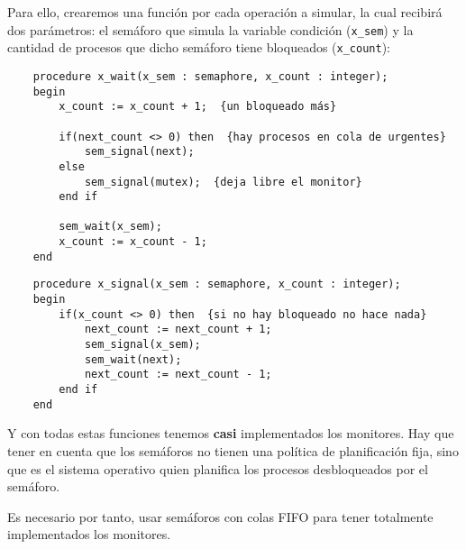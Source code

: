 Para ello, crearemos una función por cada operación a simular, la cual recibirá dos parámetros: el semáforo que simula la variable condición (\verb|x_sem|) y la cantidad de procesos que dicho semáforo tiene bloqueados (\verb|x_count|):
\begin{verbatim}
    procedure x_wait(x_sem : semaphore, x_count : integer);
    begin
        x_count := x_count + 1;  {un bloqueado más}

        if(next_count <> 0) then  {hay procesos en cola de urgentes}
            sem_signal(next);
        else
            sem_signal(mutex);  {deja libre el monitor}
        end if

        sem_wait(x_sem);
        x_count := x_count - 1;
    end
\end{verbatim}
\begin{verbatim}
    procedure x_signal(x_sem : semaphore, x_count : integer);
    begin
        if(x_count <> 0) then  {si no hay bloqueado no hace nada}
            next_count := next_count + 1;
            sem_signal(x_sem);
            sem_wait(next);
            next_count := next_count - 1;
        end if
    end
\end{verbatim}
Y con todas estas funciones tenemos \textbf{casi} implementados los monitores. Hay que tener en cuenta que los semáforos no tienen una política de planificación fija, sino que es el sistema operativo quien planifica los procesos desbloqueados por el semáforo.

Es necesario por tanto, usar semáforos con colas FIFO para tener totalmente implementados los monitores.
